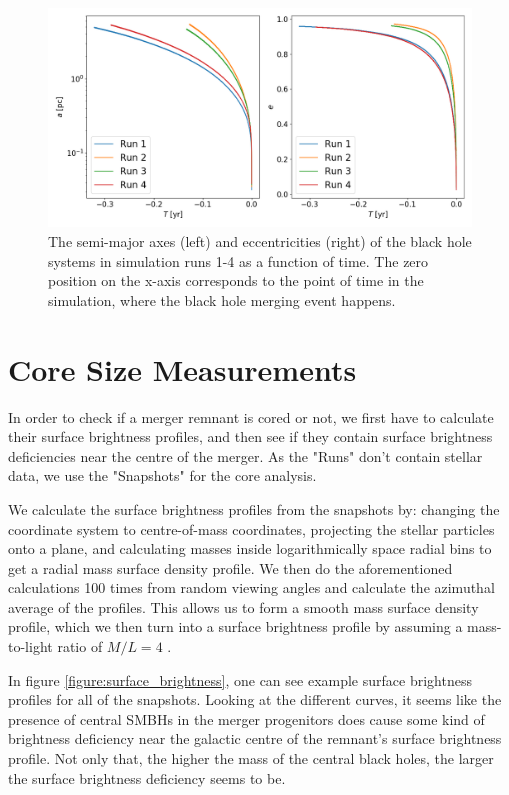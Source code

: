 \documentclass[english, oneside]{HYgradu}
\begin{document}
\begin{figure}[h]
	\centering
	\includegraphics[width=\textwidth]{semi_major_and_ecc.png}
	\caption{The semi-major axes (left) and eccentricities (right) of the black hole systems in simulation runs 1-4 as a function of time. The zero position on the x-axis corresponds to the point of time in the simulation, where the black hole merging event happens.}
\end{figure}

\section{Core Size Measurements}

In order to check if a merger remnant is cored or not, we first have to calculate their surface brightness profiles, and then see if they contain surface brightness deficiencies near the centre of the merger. As the "Runs" don't contain stellar data, we use the "Snapshots" for the core analysis. 

We calculate the surface brightness profiles from the snapshots by: changing the coordinate system to centre-of-mass coordinates, projecting the stellar particles onto a plane, and calculating masses inside logarithmically space radial bins to get a radial mass surface density profile. We then do the aforementioned calculations 100 times from random viewing angles and calculate the azimuthal average of the profiles. This allows us to form a smooth mass surface density profile, which we then turn into a surface brightness profile by assuming a mass-to-light ratio of $M/L = 4$ \citep{Rantala2018}.

In figure \ref{figure:surface_brightness}, one can see example surface brightness profiles for all of the snapshots. Looking at the different curves, it seems like the presence of central SMBHs in the merger progenitors does cause some kind of brightness deficiency near the galactic centre of the remnant's surface brightness profile. Not only that, the higher the mass of the central black holes, the larger the surface brightness deficiency seems to be.
\end{document}
